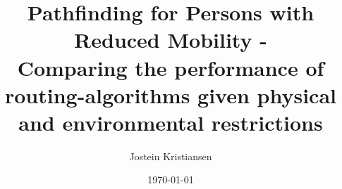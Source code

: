 
\title{Pathfinding for Persons with Reduced Mobility -\\
	Comparing the performance of routing-algorithms given physical and environmental restrictions}

\author{Jostein Kristiansen}




\date{\today} %




\maketitle



